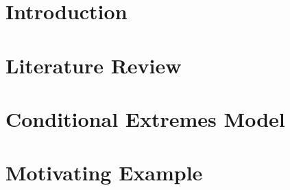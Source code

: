\documentclass{article}
\numberwithin{equation}{section}
\begin{document}
\tableofcontents

\newpage


\section{Introduction}\label{sec:intro}

\section{Literature Review}\label{sec:lit_review}

\section{Conditional Extremes Model}\label{sec:lit_review}

\section{Motivating Example}\label{sec:example}


\end{document}
